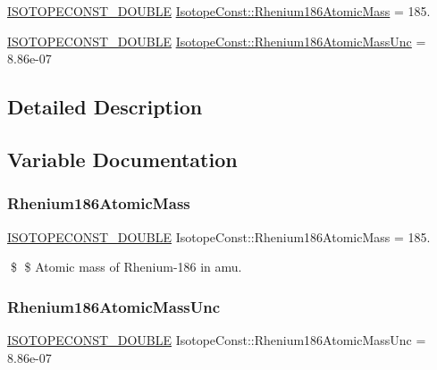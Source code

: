 \begin{DoxyCompactItemize}
\item 
\mbox{\hyperlink{group___isotope_const-_macros_ga8f45a7272ce02c0b4c65c44636ed719a}{I\+S\+O\+T\+O\+P\+E\+C\+O\+N\+S\+T\+\_\+\+D\+O\+U\+B\+LE}} \mbox{\hyperlink{group___isotope_const-_rhenium-_re186_ga32dc3827bff277a45f44a17355501f42}{Isotope\+Const\+::\+Rhenium186\+Atomic\+Mass}} = 185.
\item 
\mbox{\hyperlink{group___isotope_const-_macros_ga8f45a7272ce02c0b4c65c44636ed719a}{I\+S\+O\+T\+O\+P\+E\+C\+O\+N\+S\+T\+\_\+\+D\+O\+U\+B\+LE}} \mbox{\hyperlink{group___isotope_const-_rhenium-_re186_gaec18c9cc2e2fd595aa036a98b0c352a7}{Isotope\+Const\+::\+Rhenium186\+Atomic\+Mass\+Unc}} = 8.\+86e-\/07
\end{DoxyCompactItemize}


\subsection{Detailed Description}


\subsection{Variable Documentation}
\mbox{\label{group___isotope_const-_rhenium-_re186_ga32dc3827bff277a45f44a17355501f42}} 
\subsubsection{\texorpdfstring{Rhenium186\+Atomic\+Mass}{Rhenium186AtomicMass}}
{\footnotesize\ttfamily \mbox{\hyperlink{group___isotope_const-_macros_ga8f45a7272ce02c0b4c65c44636ed719a}{I\+S\+O\+T\+O\+P\+E\+C\+O\+N\+S\+T\+\_\+\+D\+O\+U\+B\+LE}} Isotope\+Const\+::\+Rhenium186\+Atomic\+Mass = 185.}

\$ \$ Atomic mass of Rhenium-\/186 in amu. \mbox{\label{group___isotope_const-_rhenium-_re186_gaec18c9cc2e2fd595aa036a98b0c352a7}} 
\subsubsection{\texorpdfstring{Rhenium186\+Atomic\+Mass\+Unc}{Rhenium186AtomicMassUnc}}
{\footnotesize\ttfamily \mbox{\hyperlink{group___isotope_const-_macros_ga8f45a7272ce02c0b4c65c44636ed719a}{I\+S\+O\+T\+O\+P\+E\+C\+O\+N\+S\+T\+\_\+\+D\+O\+U\+B\+LE}} Isotope\+Const\+::\+Rhenium186\+Atomic\+Mass\+Unc = 8.\+86e-\/07}

